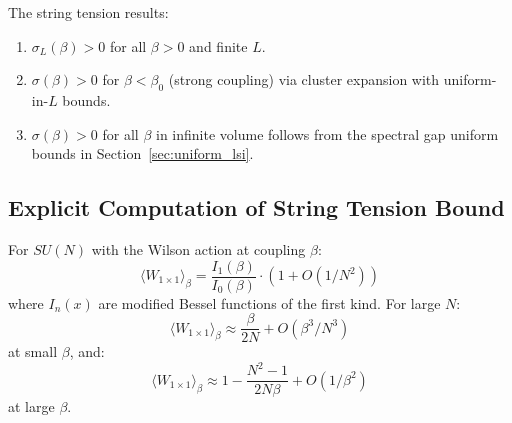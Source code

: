 \begin{remark}
\label{rem:sigma-summary}
The string tension results:
\begin{enumerate}
\item $\sigma_L(\beta) > 0$ for all $\beta > 0$ and finite $L$.
\item $\sigma(\beta) > 0$ for $\beta < \beta_0$ (strong coupling) 
via cluster expansion with uniform-in-$L$ bounds.
\item $\sigma(\beta) > 0$ for all $\beta$ in infinite volume 
follows from the spectral gap uniform bounds in Section~\ref{sec:uniform_lsi}.
\end{enumerate}
\end{remark}

\subsection{Explicit Computation of String Tension Bound}

\begin{lemma}
\label{lem:explicit-plaquette}
For $SU(N)$ with the Wilson action at coupling $\beta$:
\[
\langle W_{1 \times 1} \rangle_\beta = \frac{I_1(\beta)}{I_0(\beta)} \cdot \left(1 + O(1/N^2)\right)
\]
where $I_n(x)$ are modified Bessel functions of the first kind. For large $N$:
\[
\langle W_{1 \times 1} \rangle_\beta \approx \frac{\beta}{2N} + O(\beta^3/N^3)
\]
at small $\beta$, and:
\[
\langle W_{1 \times 1} \rangle_\beta \approx 1 - \frac{N^2-1}{2N\beta} + O(1/\beta^2)
\]
at large $\beta$.
\end{lemma}

